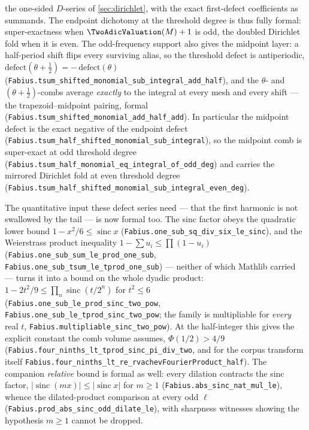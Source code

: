 \documentclass[11pt,oneside]{article}
\numberwithin{equation}{section}
\theoremstyle{definition}
\theoremstyle{remark}
\begin{document}
the one-sided $D$-series of \cref{sec:dirichlet}, with the exact first-defect
coefficients as summands.  The endpoint dichotomy at the threshold degree is thus
fully formal: super-exactness when $\TwoAdicValuation(M)+1$ is odd, the doubled Dirichlet fold
when it is even.  The odd-frequency support also gives the midpoint layer: a
half-period shift flips every surviving alias, so the threshold defect is
antiperiodic,
$\mathrm{defect}(\theta+\tfrac12)=-\,\mathrm{defect}(\theta)$
(\nolinkurl{Fabius.tsum_shifted_monomial_sub_integral_add_half}), and the $\theta$- and
$(\theta+\tfrac12)$-combs average \emph{exactly} to the integral at every mesh and
every shift --- the trapezoid--midpoint pairing, formal
(\nolinkurl{Fabius.tsum_shifted_monomial_add_half_add}).  In particular the midpoint
defect is the exact negative of the endpoint defect
(\nolinkurl{Fabius.tsum_half_shifted_monomial_sub_integral}), so the midpoint comb is
super-exact at odd threshold degree
(\nolinkurl{Fabius.tsum_half_monomial_eq_integral_of_odd_deg}) and carries the mirrored
Dirichlet fold at even threshold degree
(\nolinkurl{Fabius.tsum_half_shifted_monomial_sub_integral_even_deg}).

The quantitative input these defect series need --- that the first harmonic is not
swallowed by the tail --- is now formal too.  The sinc factor obeys the quadratic lower
bound \(1-x^2/6\le\operatorname{sinc}x\) (\nolinkurl{Fabius.one_sub_sq_div_six_le_sinc}),
and the Weierstrass product inequality \(1-\sum u_i\le\prod(1-u_i)\)
(\nolinkurl{Fabius.one_sub_sum_le_prod_one_sub}, \nolinkurl{Fabius.one_sub_tsum_le_tprod_one_sub}) ---
neither of which Mathlib carried --- turns it into a bound on the whole dyadic product:
\(1-2t^2/9\le\prod_{n}\operatorname{sinc}(t/2^n)\) for \(t^2\le6\)
(\nolinkurl{Fabius.one_sub_le_prod_sinc_two_pow}, \nolinkurl{Fabius.one_sub_le_tprod_sinc_two_pow};
the family is multipliable for \emph{every} real \(t\),
\nolinkurl{Fabius.multipliable_sinc_two_pow}).  At the half-integer this gives the
explicit constant the comb volume assumes,
\(\Phi(1/2)>4/9\)
(\nolinkurl{Fabius.four_ninths_lt_tprod_sinc_pi_div_two}, and for the corpus transform
itself \nolinkurl{Fabius.four_ninths_lt_re_rvachevFourierProduct_half}).  The companion
\emph{relative} bound is formal as well: every dilation contracts the sinc factor,
\(\lvert\operatorname{sinc}(mx)\rvert\le\lvert\operatorname{sinc}x\rvert\) for \(m\ge1\)
(\nolinkurl{Fabius.abs_sinc_nat_mul_le}), whence the dilated-product comparison at every
odd \(\ell\) (\nolinkurl{Fabius.prod_abs_sinc_odd_dilate_le}), with sharpness witnesses
showing the hypothesis \(m\ge1\) cannot be dropped.
\end{document}
